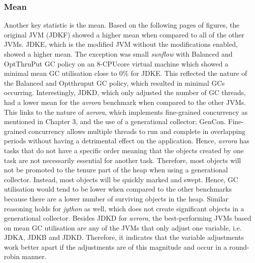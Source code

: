 \subsubsection{Mean}
Another key statistic
is the mean. Based on the following pages of figures, the original JVM (JDKF)
showed a higher mean when compared to all of the other JVMs. JDKE,
which is the modified JVM without the modifications enabled, showed a
higher mean. The exception was small \emph{sunflow} with Balanced and
OptThruPut GC policy on an 8-CPUcore virtual machine which showed a minimal
mean GC utilisation close to 0\% for JDKE. This reflected the nature of
the Balanced and Optthruput GC policy, which resulted in minimal GCs
occurring.
\newline\newline
Interestingly, JDKD, which only adjusted the number of GC threads, had a
lower mean for the \emph{avrora} benchmark when compared to the other JVMs.
This links to the nature of \emph{avrora}, which implements fine-grained
concurrency as mentioned in Chapter 3, and the use of a generational
collector; GenCon. Fine-grained concurrency allows multiple threads to
run and complete in overlapping periods without having a detrimental
effect on the application. Hence, \emph{avrora} has tasks that do not have a
specific order meaning that the objects created by one task are not
necessarily essential for another task. Therefore, most objects will not
be promoted to the tenure part of the heap when using a generational
collector. Instead, most objects will be quickly marked and swept.
Hence, GC utilisation would tend to be lower when compared to the other
benchmarks because there are a lower number of surviving objects in the
heap. 
\newline\newline
Similar reasoning holds for \emph{jython} as well, which does not create
significant objects in a generational collector. Besides JDKD for
\emph{avrora}, the best-performing JVMs based on mean GC utilisation are any of
the JVMs that only adjust one variable, i.e. JDKA, JDKB and JDKD.
Therefore, it indicates that the variable adjustments work better apart
if the adjustments are of this magnitude and occur in a round-robin manner. 
